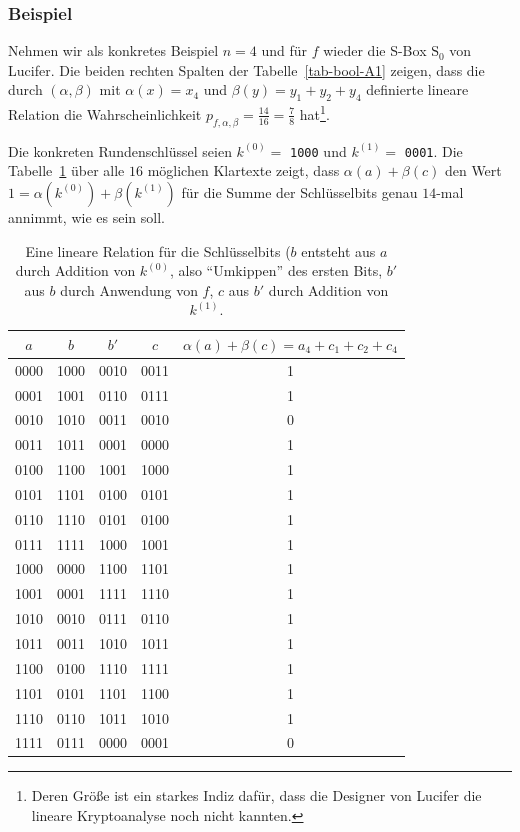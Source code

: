 \begin{refsegment}
\subsubsection*{Beispiel}

Nehmen wir als konkretes Beispiel $n = 4$ und für $f$ wieder die S-Box
$\mathrm{S}_0$ von {\sc Lucifer}. Die beiden rechten Spalten der
Tabelle~\ref{tab-bool-A1} zeigen, dass die durch $(\alpha,\beta)$ mit $\alpha(x) = x_4$
und $\beta(y) = y_1+y_2+y_4$ definierte lineare Relation die Wahrscheinlichkeit
$p_{f,\alpha,\beta} = \frac{14}{16} = \frac{7}{8}$ hat\footnote{%
  Deren Größe ist ein starkes Indiz dafür, dass die Designer von
  {\sc Lucifer} die lineare
  Kryptoanalyse
  noch nicht kannten.
}.

Die konkreten Rundenschlüssel seien
$k^{(0)} =$ \verb:1000: und $k^{(1)} =$ \verb:0001:.
Die Tabelle~\ref{tab-bool-linrel} über alle $16$ möglichen
Klartexte zeigt, dass $\alpha(a)+\beta(c)$ den Wert $1 =\alpha(k^{(0)}) + \beta(k^{(1)})$
für die Summe der Schlüsselbits genau $14$-mal annimmt, wie es sein soll.

\begin{table}
\begin{center}
\begin{tabular}{|cccc|c|} \hline
  $a$  & $b$  & $b'$ & $c$  & $\alpha(a)+\beta(c) = a_4 + c_1 + c_2 + c_4$ \\ \hline
  0000 & 1000 & 0010 & 0011 & 1 \\
  0001 & 1001 & 0110 & 0111 & 1 \\
  0010 & 1010 & 0011 & 0010 & 0 \\
  0011 & 1011 & 0001 & 0000 & 1 \\
  0100 & 1100 & 1001 & 1000 & 1 \\
  0101 & 1101 & 0100 & 0101 & 1 \\
  0110 & 1110 & 0101 & 0100 & 1 \\
  0111 & 1111 & 1000 & 1001 & 1 \\
  1000 & 0000 & 1100 & 1101 & 1 \\
  1001 & 0001 & 1111 & 1110 & 1 \\
  1010 & 0010 & 0111 & 0110 & 1 \\
  1011 & 0011 & 1010 & 1011 & 1 \\
  1100 & 0100 & 1110 & 1111 & 1 \\
  1101 & 0101 & 1101 & 1100 & 1 \\
  1110 & 0110 & 1011 & 1010 & 1 \\
  1111 & 0111 & 0000 & 0001 & 0 \\
  \hline
\end{tabular}
\end{center}
\caption{Eine lineare Relation für die Schlüsselbits ($b$ entsteht aus $a$ durch Addition
   von $k^{(0)}$, also ``Umkippen'' des ersten Bits, $b'$ aus $b$ durch Anwendung
   von $f$, $c$ aus $b'$ durch Addition von $k^{(1)}$.}\label{tab-bool-linrel}
\end{table}


\end{refsegment}

